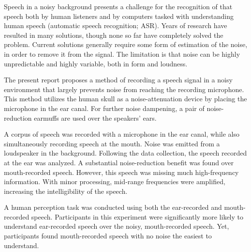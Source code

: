 % 


Speech in a noisy background presents a challenge for the recognition of that speech both by human listeners and by computers tasked with understanding human speech (automatic speech recognition; ASR).  Years of research have resulted in many solutions, though none so far have completely solved the problem.  Current solutions generally require some form of estimation of the noise, in order to remove it from the signal. The limitation is that noise can be highly unpredictable and highly variable, both in form and loudness.

The present report proposes a method of recording a speech signal in a noisy environment that largely prevents noise from reaching the recording microphone.  This method utilizes the human skull as a noise-attenuation device by placing the microphone in the ear canal.  For further noise dampening, a pair of noise-reduction earmuffs are used over the speakers' ears.

A corpus of speech was recorded with a microphone in the ear canal, while also simultaneously recording speech at the mouth.  Noise was emitted from a loudspeaker in the background.  Following the data collection, the speech recorded at the ear was analyzed.  A substantial noise-reduction benefit was found over mouth-recorded speech.  However, this speech was missing much high-frequency information.  With minor processing, mid-range frequencies were amplified, increasing the intelligibility of the speech.

A human perception task was conducted using both the ear-recorded and mouth-recorded speech.  Participants in this experiment were significantly more likely to understand ear-recorded speech over the noisy, mouth-recorded speech.  Yet, participants found mouth-recorded speech with no noise the easiest to understand.

